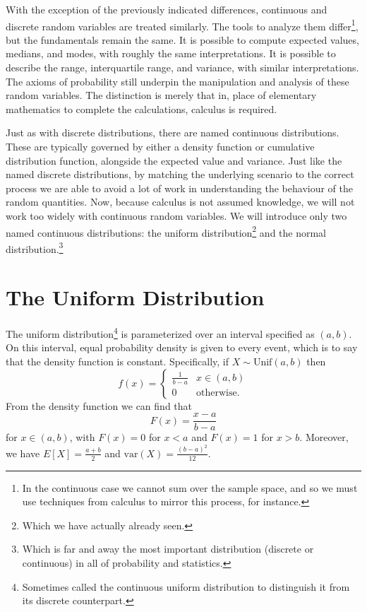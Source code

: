 \documentclass[
  letterpaper,
  DIV=11,
  numbers=noendperiod]{scrreprt}
\theoremstyle{definition}
\theoremstyle{definition}
\theoremstyle{definition}
\theoremstyle{remark}
\begin{document}
With the exception of the previously indicated differences, continuous
and discrete random variables are treated similarly. The tools to
analyze them differ\footnote{In the continuous case we cannot sum over
  the sample space, and so we must use techniques from calculus to
  mirror this process, for instance.}, but the fundamentals remain the
same. It is possible to compute expected values, medians, and modes,
with roughly the same interpretations. It is possible to describe the
range, interquartile range, and variance, with similar interpretations.
The axioms of probability still underpin the manipulation and analysis
of these random variables. The distinction is merely that in, place of
elementary mathematics to complete the calculations, calculus is
required.

Just as with discrete distributions, there are named continuous
distributions. These are typically governed by either a density function
or cumulative distribution function, alongside the expected value and
variance. Just like the named discrete distributions, by matching the
underlying scenario to the correct process we are able to avoid a lot of
work in understanding the behaviour of the random quantities. Now,
because calculus is not assumed knowledge, we will not work too widely
with continuous random variables. We will introduce only two named
continuous distributions: the uniform distribution\footnote{Which we
  have actually already seen.} and the normal distribution.\footnote{Which
  is far and away the most important distribution (discrete or
  continuous) in all of probability and statistics.}

\section{The Uniform Distribution}\label{the-uniform-distribution}

The uniform distribution\footnote{Sometimes called the continuous
  uniform distribution to distinguish it from its discrete counterpart.}
is parameterized over an interval specified as \((a,b)\). On this
interval, equal probability density is given to every event, which is to
say that the density function is constant. Specifically, if
\(X\sim\text{Unif}(a,b)\) then
\[f(x) = \begin{cases}\frac{1}{b-a} & x \in (a,b) \\ 0 & \text{otherwise}.\end{cases}\]
From the density function we can find that
\[F(x) = \frac{x - a}{b - a}\] for \(x \in (a,b)\), with \(F(x) = 0\)
for \(x < a\) and \(F(x) = 1\) for \(x > b\). Moreover, we have
\(E[X] = \frac{a+b}{2}\) and \(\text{var}(X) = \frac{(b-a)^2}{12}\).
\end{document}
